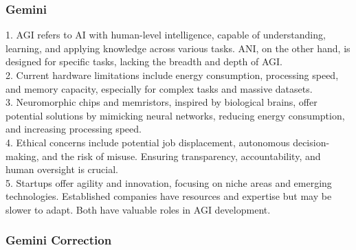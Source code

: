 \subsubsection{Gemini}
\begin{tcolorbox}[breakable]
1. AGI refers to AI with human-level intelligence, capable of understanding, learning, and applying knowledge across various tasks. ANI, on the other hand, is designed for specific tasks, lacking the breadth and depth of AGI.\\
2. Current hardware limitations include energy consumption, processing speed, and memory capacity, especially for complex tasks and massive datasets.\\
3. Neuromorphic chips and memristors, inspired by biological brains, offer potential solutions by mimicking neural networks, reducing energy consumption, and increasing processing speed.\\
4. Ethical concerns include potential job displacement, autonomous decision-making, and the risk of misuse. Ensuring transparency, accountability, and human oversight is crucial.\\
5. Startups offer agility and innovation, focusing on niche areas and emerging technologies. Established companies have resources and expertise but may be slower to adapt. Both have valuable roles in AGI development.\\
\end{tcolorbox}
\subsubsection{Gemini Correction}
\begin{tcolorbox}[breakable]
    
\end{tcolorbox}
